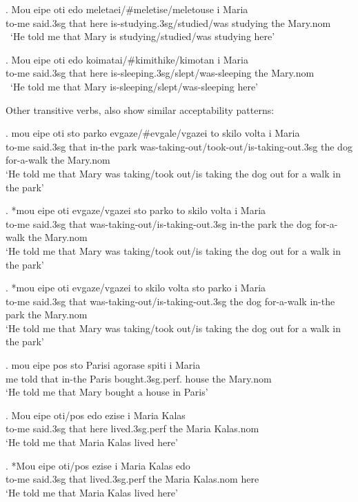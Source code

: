 \documentclass[11pt]{article}
\begin{document}
\exg.
Mou eipe oti edo meletaei/\#meletise/meletouse i Maria\\
to-me said.3sg that here is-studying.3sg/studied/was studying the Mary.nom\\ \label{evi20}\
`He told me that Mary is studying/studied/was studying here'

\exg.
Mou eipe oti edo koimatai/\#kimithike/kimotan i Maria\\
to-me said.3sg that here is-sleeping.3sg/slept/was-sleeping the Mary.nom\\ \label{evi21}\
`He told me that Mary is-sleeping/slept/was-sleeping here'


Other transitive verbs, also show similar acceptability patterns: 

\exg.
mou eipe oti sto parko evgaze/\#evgale/vgazei to skilo volta i Maria\\
to-me said.3sg that in-the park was-taking-out/took-out/is-taking-out.3sg the dog for-a-walk the Mary.nom\\ \label{embedded1}
`He told me that Mary was taking/took out/is taking the dog out for a walk in the park'

\exg.
*mou eipe oti evgaze/vgazei sto parko to skilo volta i Maria\\
to-me said.3sg that  was-taking-out/is-taking-out.3sg  in-the park the dog for-a-walk the Mary.nom\\ \label{embedded11}
`He told me that Mary was taking/took out/is taking the dog out for a walk in the park'

\exg.
*mou eipe oti evgaze/vgazei  to skilo volta sto parko i Maria\\
to-me said.3sg that  was-taking-out/is-taking-out.3sg the dog for-a-walk in-the park the Mary.nom\\ \label{embedded12}
`He told me that Mary was taking/took out/is taking the dog out for a walk in the park'

\exg.
mou eipe pos sto Parisi agorase spiti i Maria\\
me told that in-the Paris bought.3sg.perf. house the Mary.nom\\ \label{embedded22}
`He told me that Mary bought a house in Paris'

\exg.
Mou eipe oti/pos edo ezise i Maria Kalas\\
to-me said.3sg that here lived.3sg.perf the Maria Kalas.nom \label{embeddedpinto}\\
`He told me that Maria Kalas lived here'

\exg.
*Mou eipe oti/pos ezise i Maria Kalas edo\\
to-me said.3sg that lived.3sg.perf the Maria Kalas.nom here \label{embeddedpinto2}\\
`He told me that Maria Kalas lived here'
\end{document}
